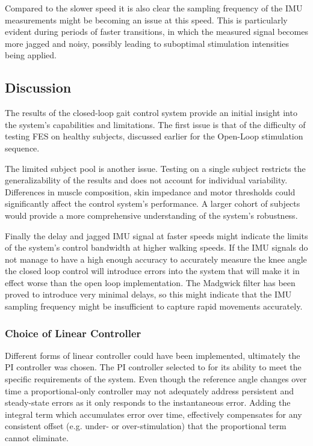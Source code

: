 Compared to the slower speed it is also clear the sampling frequency of the IMU measurements might be becoming an issue at this speed. This is particularly evident during periods of faster transitions, in which the measured signal becomes more jagged and noisy, possibly leading to suboptimal stimulation intensities being applied. 

\subsection{Discussion}
The results of the closed-loop gait control system provide an initial insight into the system's capabilities and limitations. The first issue is that of the difficulty of testing FES on healthy subjects, discussed earlier for the Open-Loop stimulation sequence.

The limited subject pool is another issue. Testing on a single subject restricts the generalizability of the results and does not account for individual variability. Differences in muscle composition, skin impedance and motor thresholds could significantly affect the control system's performance. A larger cohort of subjects would provide a more comprehensive understanding of the system's robustness.

Finally the delay and jagged IMU signal at faster speeds might indicate the limits of the system's control bandwidth at higher walking speeds. If the IMU signals do not manage to have a high enough accuracy to accurately measure the knee angle the closed loop control will introduce errors into the system that will make it in effect worse than the open loop implementation. The Madgwick filter has been proved to introduce very minimal delays, so this might indicate that the IMU sampling frequency might be insufficient to capture rapid movements accurately. 

\subsubsection*{Choice of Linear Controller}
Different forms of linear controller could have been implemented, ultimately the PI controller was chosen. 
The PI controller selected to for its ability to meet the specific requirements of the system.  Even though the reference angle changes over time a proportional-only controller may not adequately address persistent and steady-state errors as it only responds to the instantaneous error. Adding the integral term which accumulates error over time, effectively compensates for any consistent offset (e.g. under- or over-stimulation) that the proportional term cannot eliminate. 

